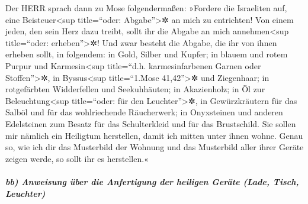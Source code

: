  Der HERR sprach dann zu Mose folgendermaßen:
 »Fordere die Israeliten auf, eine Beisteuer\textless sup
title=``oder: Abgabe''\textgreater✲ an mich zu entrichten! Von einem
jeden, den sein Herz dazu treibt, sollt ihr die Abgabe an mich
annehmen\textless sup title=``oder: erheben''\textgreater✲!
 Und zwar besteht die Abgabe, die ihr von ihnen erheben
sollt, in folgendem: in Gold, Silber und Kupfer;  in
blauem und rotem Purpur und Karmesin\textless sup title=``d.h.
karmesinfarbenen Garnen oder Stoffen''\textgreater✲, in
Byssus\textless sup title=``1.Mose 41,42''\textgreater✲ und Ziegenhaar;
 in rotgefärbten Widderfellen und Seekuhhäuten; in
Akazienholz;  in Öl zur Beleuchtung\textless sup
title=``oder: für den Leuchter''\textgreater✲, in Gewürzkräutern für das
Salböl und für das wohlriechende Räucherwerk;  in
Onyxsteinen und anderen Edelsteinen zum Besatz für das Schulterkleid und
für das Brustschild.  Sie sollen mir nämlich ein Heiligtum
herstellen, damit ich mitten unter ihnen wohne.  Genau so,
wie ich dir das Musterbild der Wohnung und das Musterbild aller ihrer
Geräte zeigen werde, so sollt ihr es herstellen.«

\hypertarget{bb-anweisung-uxfcber-die-anfertigung-der-heiligen-geruxe4te-lade-tisch-leuchter}{%
\subparagraph{bb) Anweisung über die Anfertigung der heiligen Geräte
(Lade, Tisch,
Leuchter)}\label{bb-anweisung-uxfcber-die-anfertigung-der-heiligen-geruxe4te-lade-tisch-leuchter}}

